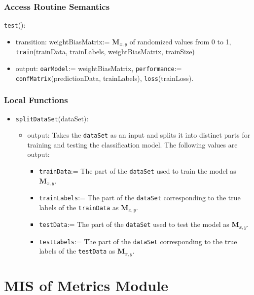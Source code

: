 \documentclass[12pt, titlepage]{article}
\def\code#1{\texttt{#1}}
\begin{document}
\subsubsection{Access Routine Semantics}

\noindent \code{test}():
\begin{itemize}
\item transition: weightBiasMatrix:= $\mathbf{M}_{x,y}$ of randomized values from 0 to 1, \code{train}(trainData, trainLabels, weightBiasMatrix, trainSize)
\item output: \code{oarModel}:= weightBiasMatrix, \code{performance}:= \code{confMatrix}(predictionData, trainLabels), \code{loss}(trainLoss).
\end{itemize}

\subsubsection{Local Functions}

\begin{itemize}
\item \code{splitDataSet}(dataSet):
  \begin{itemize}
    \item output: Takes the \code{dataSet} as an input and splits it into distinct parts for training and testing the classification model.
    The following values are output:
    \begin{itemize}
      \item \code{trainData}:= The part of the \code{dataSet} used to train the model as $\mathbf{M}_{x,y}$.
      \item \code{trainLabels}:= The part of the \code{dataSet} corresponding to the true labels of the \code{trainData} as $\mathbf{M}_{x,y}$.
      \item \code{testData}:= The part of the \code{dataSet} used to test the model as $\mathbf{M}_{x,y}$.
      \item \code{testLabels}:= The part of the \code{dataSet} corresponding to the true labels of the \code{testData} as $\mathbf{M}_{x,y}$.
    \end{itemize}
  \end{itemize}
\end{itemize}

\section{MIS of Metrics Module} \label{ModuleCM} 
\end{document}
